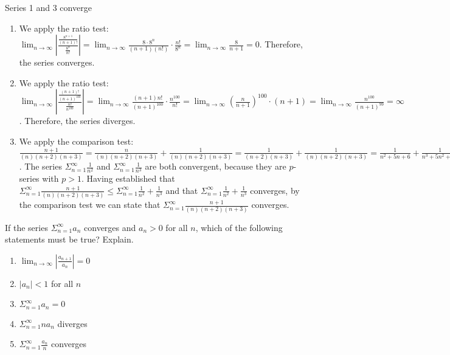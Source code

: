 \begin{Answer}[ref = ratio1]
Series 1 and 3 converge
\begin{enumerate}
\item We apply the ratio test: $\lim_{n \to \infty} \left| \frac{\frac{8^
{n + 1}}{(n + 1)!}}{\frac{8^n}{n!}} \right| = \lim_{n \to \infty} \frac{8 
\cdot 8^n}{(n + 1)(n!)} \cdot \frac{n!}{8^n} = \lim_{n \to \infty} 
\frac{8}{n + 1} = 0$. Therefore, the series converges. 
\item We apply the ratio test: $\lim_{n \to \infty} \left| \frac{\frac{(n + 1)!}
{(n + 1)^{100}}}{\frac{n!}{n^{100}}} \right| = \lim_{n \to \infty} \frac{(n + 1)
n!}{(n + 1)^{100}} \cdot \frac{n^{100}}{n!} = \lim_{n \to \infty} \left( 
\frac{n}{n + 1} \right)^{100} \cdot (n + 1) = \lim_{n \to \infty} \frac{n^{100}
}{(n + 1)^{99}} = \infty$. Therefore, the series diverges. 
\item We apply the comparison test: $\frac{n + 1}{(n)(n + 2)(n + 3)} = \frac{n}
{(n)(n + 2)(n + 3)} + \frac{1}{(n)(n + 2)(n + 3)} = \frac{1}{(n + 2)(n + 3)} + 
\frac{1}{(n)(n + 2)(n + 3)} = \frac{1}{n^2 + 5n + 6} + \frac{1}{n^3 + 5n^2 + 
6n} \leq \frac{1}{n^2} + \frac{1}{n^3}$. The series $\Sigma_{n = 1}^\infty 
\frac{1}{n^2}$ and $\Sigma_{n = 1}^\infty \frac{1}{n^3}$ are both convergent, 
because they are $p$-series with $p > 1$. Having established that $\Sigma_{n=1}
^\infty \frac{n + 1}{(n)(n + 2)(n + 3)} \leq \Sigma_{n=1}^\infty \frac{1}{n^2} 
+ \frac{1}{n^3}$ and that $\Sigma_{n=1}^\infty \frac{1}{n^2} + \frac{1}{n^3}$ 
converges, by the comparison test we can state that $\Sigma_{n=1}^\infty 
\frac{n + 1}{(n)(n+2)(n+3)}$ converges. 
\end{enumerate}
\end{Answer}

\begin{Exercise}If the series $\Sigma_{n = 1}^\infty 
a_n$ converges and $a_n > 0$ for all $n$, which of the following statements 
must be true? Explain. 
\begin{enumerate}
\item $\lim_{n \to \infty} \left| \frac{a_{n + 1}}{a_n} \right| = 0$
\item $|a_n|<1$ for all $n$
\item $\Sigma_{n=1}^\infty a_n = 0$
\item $\Sigma_{n=1}^\infty na_n$ diverges
\item $\Sigma_{n=1}^\infty \frac{a_n}{n}$ converges
\end{enumerate}
\end{Exercise}

